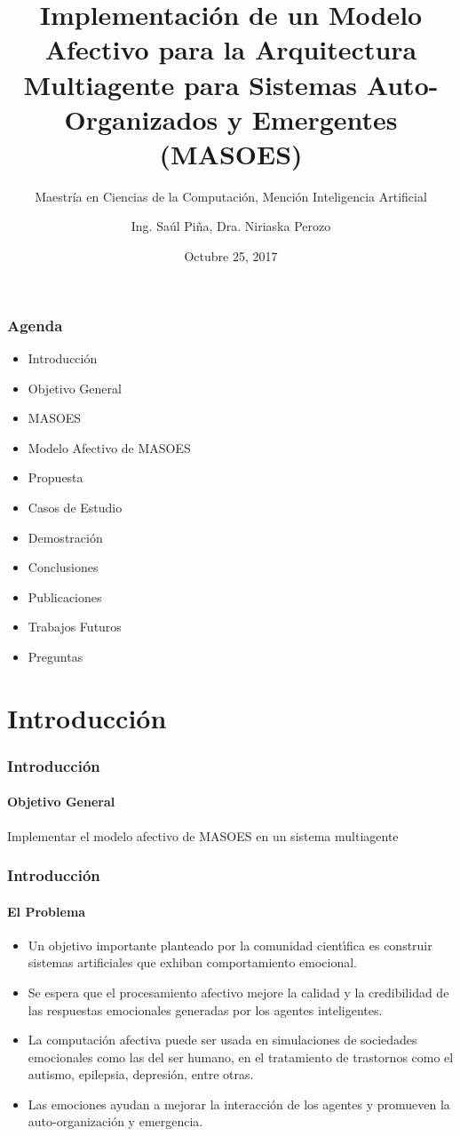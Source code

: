\documentclass{beamer}
\title{Implementación de un Modelo Afectivo para la Arquitectura Multiagente para Sistemas Auto-Organizados y Emergentes (MASOES)}
\subtitle{Maestría en Ciencias de la Computación, Mención Inteligencia Artificial}
\author{Ing. Saúl Piña, Dra. Niriaska Perozo}
\date{Octubre 25, 2017}
\institute{\url{sauljabin@gmail.com}, \url{nperozo@ucla.edu.ve}}
\begin{document}
\begin{frame}[plain,t]
\titlepage
\end{frame}

\begin{frame}
\frametitle{Agenda}
\begin{itemize}
\item Introducción
\item Objetivo General
\item MASOES
\item Modelo Afectivo de MASOES
\item Propuesta
\item Casos de Estudio
\item Demostración
\item Conclusiones
\item Publicaciones
\item Trabajos Futuros
\item Preguntas
\end{itemize}
\end{frame}

\section{Introducción}

\begin{frame}
\frametitle{Introducción}
\framesubtitle{Objetivo General}
\huge
Implementar el modelo afectivo de MASOES en un sistema multiagente
\end{frame}

\begin{frame}
\frametitle{Introducción}
\framesubtitle{El Problema}
\begin{itemize}
\item Un objetivo importante planteado por la
comunidad cientı́fica es construir sistemas artificiales que exhiban comportamiento emocional.
\item Se espera que el procesamiento afectivo mejore la calidad y la
credibilidad de las respuestas emocionales generadas por los
agentes inteligentes.
\item La computación afectiva puede ser usada en simulaciones de sociedades
emocionales como las del ser humano, en el tratamiento
de trastornos como el autismo, epilepsia, depresión, entre otras.
\item Las emociones ayudan a mejorar la interacción de los agentes y promueven la
auto-organización y emergencia.
\end{itemize}
\end{frame}
\end{document}
